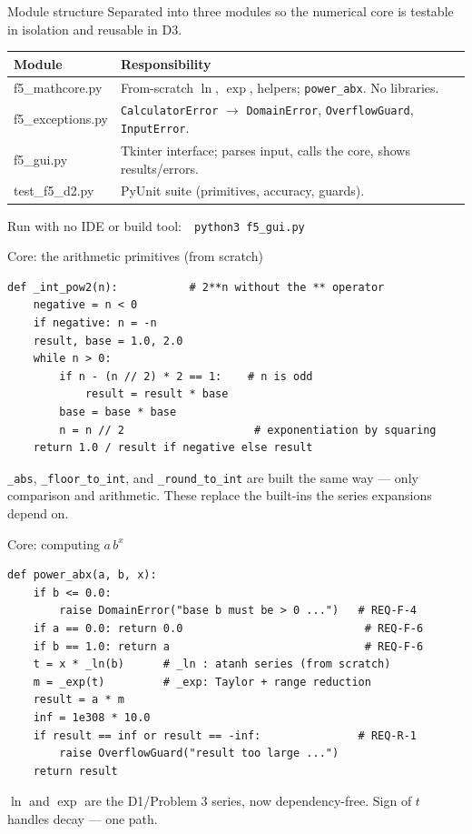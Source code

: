 \documentclass[10pt,aspectratio=169]{beamer}
\begin{document}
\begin{frame}{Module structure}
  \small
  Separated into three modules so the numerical core is testable in isolation and reusable in D3.
  \vspace{0.6em}

  \begin{tabular}{@{}>{\ttfamily}p{3.4cm} >{\raggedright\arraybackslash}p{8.2cm}@{}}
    \toprule
    \normalfont\textbf{Module} & \textbf{Responsibility} \\
    \midrule
    f5\_mathcore.py & From-scratch $\ln$, $\exp$, helpers; \texttt{power\_abx}. No libraries. \\
    f5\_exceptions.py & \texttt{CalculatorError} $\rightarrow$ \texttt{DomainError}, \texttt{OverflowGuard}, \texttt{InputError}. \\
    f5\_gui.py & Tkinter interface; parses input, calls the core, shows results/errors. \\
    test\_f5\_d2.py & PyUnit suite (primitives, accuracy, guards). \\
    \bottomrule
  \end{tabular}
  \vspace{0.5em}

  \footnotesize\textcolor{mLightTeal}{Run with no IDE or build tool:\ \ \texttt{python3 f5\_gui.py}}
\end{frame}

\begin{frame}[fragile]{Core: the arithmetic primitives (from scratch)}
\begin{lstlisting}[style=py]
def _int_pow2(n):           # 2**n without the ** operator
    negative = n < 0
    if negative: n = -n
    result, base = 1.0, 2.0
    while n > 0:
        if n - (n // 2) * 2 == 1:    # n is odd
            result = result * base
        base = base * base
        n = n // 2                    # exponentiation by squaring
    return 1.0 / result if negative else result
\end{lstlisting}
  \footnotesize
  \texttt{\_abs}, \texttt{\_floor\_to\_int}, and \texttt{\_round\_to\_int} are built the same way --- only comparison and arithmetic. These replace the built-ins the series expansions depend on.
\end{frame}

\begin{frame}[fragile]{Core: computing $a\,b^{x}$}
\begin{lstlisting}[style=py]
def power_abx(a, b, x):
    if b <= 0.0:
        raise DomainError("base b must be > 0 ...")   # REQ-F-4
    if a == 0.0: return 0.0                            # REQ-F-6
    if b == 1.0: return a                              # REQ-F-6
    t = x * _ln(b)      # _ln : atanh series (from scratch)
    m = _exp(t)         # _exp: Taylor + range reduction
    result = a * m
    inf = 1e308 * 10.0
    if result == inf or result == -inf:               # REQ-R-1
        raise OverflowGuard("result too large ...")
    return result
\end{lstlisting}
  \footnotesize\textcolor{mLightTeal}{$\ln$ and $\exp$ are the D1/Problem 3 series, now dependency-free. Sign of $t$ handles decay --- one path.}
\end{frame}
\end{document}
